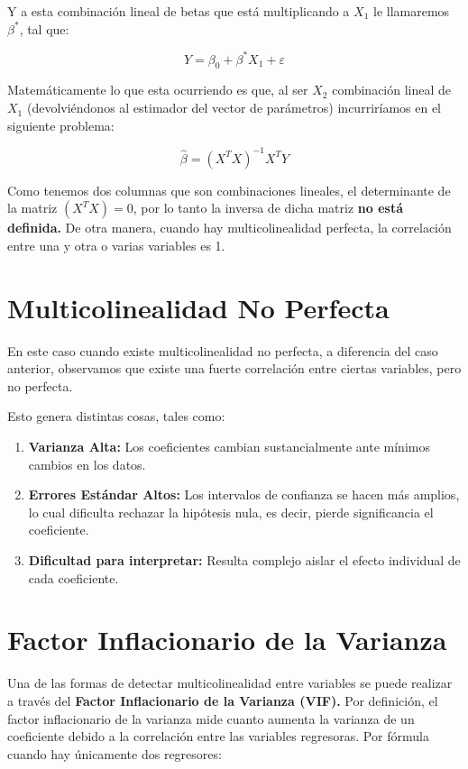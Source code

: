 \documentclass[
]{book}
\providecommand{\tightlist}{%
  \setlength{\itemsep}{0pt}\setlength{\parskip}{0pt}}
\begin{document}
Y a esta combinación lineal de betas que está multiplicando a \(X_1\) le llamaremos \(\beta^*\), tal que:

\[Y = \beta_0 + \beta^*X_1 + \varepsilon\]

Matemáticamente lo que esta ocurriendo es que, al ser \(X_2\) combinación lineal de \(X_1\) (devolviéndonos al estimador del vector de parámetros) incurriríamos en el siguiente problema:

\[\hat{\beta} = (X^TX)^{-1}X^TY\]

Como tenemos dos columnas que son combinaciones lineales, el determinante de la matriz \((X^TX) = 0\), por lo tanto la inversa de dicha matriz \textbf{no está definida.} De otra manera, cuando hay multicolinealidad perfecta, la correlación entre una y otra o varias variables es 1.

\section{Multicolinealidad No Perfecta}\label{multicolinealidad-no-perfecta}

En este caso cuando existe multicolinealidad no perfecta, a diferencia del caso anterior, observamos que existe una fuerte correlación entre ciertas variables, pero no perfecta.

Esto genera distintas cosas, tales como:

\begin{enumerate}
\def\labelenumi{\arabic{enumi}.}
\tightlist
\item
  \textbf{Varianza Alta:} Los coeficientes cambian sustancialmente ante mínimos cambios en los datos.
\item
  \textbf{Errores Estándar Altos:} Los intervalos de confianza se hacen más amplios, lo cual dificulta rechazar la hipótesis nula, es decir, pierde significancia el coeficiente.
\item
  \textbf{Dificultad para interpretar:} Resulta complejo aislar el efecto individual de cada coeficiente.
\end{enumerate}

\section{Factor Inflacionario de la Varianza}\label{factor-inflacionario-de-la-varianza}

Una de las formas de detectar multicolinealidad entre variables se puede realizar a través del \textbf{Factor Inflacionario de la Varianza (VIF).} Por definición, el factor inflacionario de la varianza mide cuanto aumenta la varianza de un coeficiente debido a la correlación entre las variables regresoras. Por fórmula cuando hay únicamente dos regresores:
\end{document}
